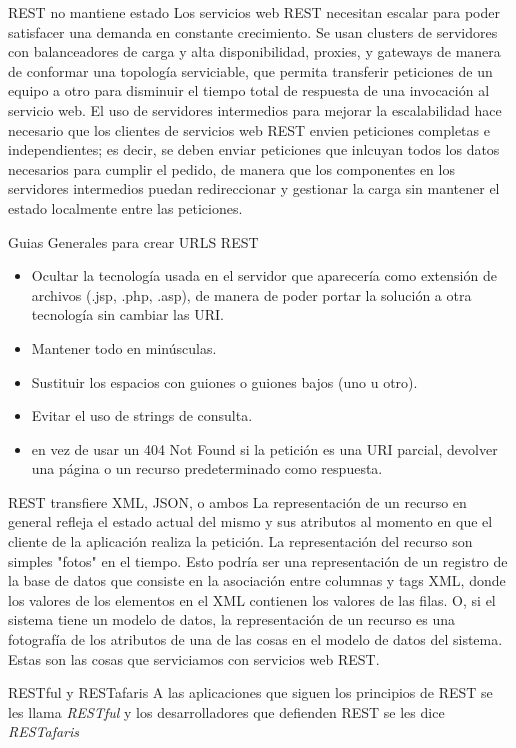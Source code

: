 \begin{frame}{REST no mantiene estado} %
Los servicios web REST necesitan escalar para poder satisfacer una demanda en
constante crecimiento. Se usan clusters de servidores con balanceadores de
carga y alta disponibilidad, proxies, y gateways de manera de conformar una
topología serviciable, que permita transferir peticiones de un equipo a otro
para disminuir el tiempo total de respuesta de una invocación al servicio web.
El uso de servidores intermedios para mejorar la escalabilidad hace necesario
que los clientes de servicios web REST envien peticiones completas e
independientes; es decir, se deben enviar peticiones que inlcuyan todos los
datos necesarios para cumplir el pedido, de manera que los componentes en los
servidores intermedios puedan redireccionar y gestionar la carga sin mantener
el estado localmente entre las peticiones.

\end{frame}

\begin{frame}{Guias Generales para crear URLS REST} %
\begin{itemize}
    
	 \item Ocultar la tecnología usada en el servidor que aparecería como extensión de archivos (.jsp, .php, .asp), de manera de poder portar la solución a otra tecnología sin cambiar las URI.
	 \item Mantener todo en minúsculas.
	 \item Sustituir los espacios con guiones o guiones bajos (uno u otro).
	 \item Evitar el uso de strings de consulta.
	 \item en vez de usar un 404 Not Found si la petición es una URI parcial, devolver una página o un recurso predeterminado como respuesta.
\end{itemize}
\end{frame}

\begin{frame}{REST transfiere XML, JSON, o ambos} %
La representación de un recurso en general refleja el estado actual del mismo y sus atributos al momento en que el cliente de la aplicación realiza la petición. La representación del recurso son simples "fotos" en el tiempo. Esto podría ser una representación de un registro de la base de datos que consiste en la asociación entre columnas y tags XML, donde los valores de los elementos en el XML contienen los valores de las filas. O, si el sistema tiene un modelo de datos, la representación de un recurso es una fotografía de los atributos de una de las cosas en el modelo de datos del sistema. Estas son las cosas que serviciamos con servicios web REST.
\end{frame}

\begin{frame}{RESTful y RESTafaris} %
    A las aplicaciones que siguen los principios de REST se les llama
    \textit{RESTful} y los desarrolladores que defienden REST se les dice
    \textit{RESTafaris}
\end{frame}


